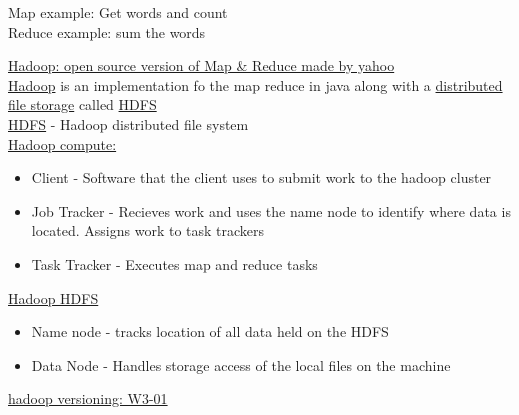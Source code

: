 \documentclass{article}
\begin{document}
Map example: Get words and count\\
Reduce example: sum the words\\

\newpage

\underline{Hadoop: open source version of Map \& Reduce made by yahoo} \\

\underline{Hadoop} is an implementation fo the map reduce in java along with a \underline{distributed file storage} called \underline{HDFS} \\
\underline{HDFS} - Hadoop distributed file system \\

\underline{Hadoop compute:}\\
\begin{itemize}
    \item Client - Software that the client uses to submit work to the hadoop cluster
    \item Job Tracker - Recieves work and uses the name node to identify where data is located. Assigns work to task trackers
    \item Task Tracker - Executes map and reduce tasks
\end{itemize}

\underline{Hadoop HDFS}
\begin{itemize}
    \item Name node - tracks location of all data held on the HDFS
    \item Data Node - Handles storage access of the local files on the machine
\end{itemize}

\newpage

\underline{hadoop versioning: W3-01} \newline
\end{document}
